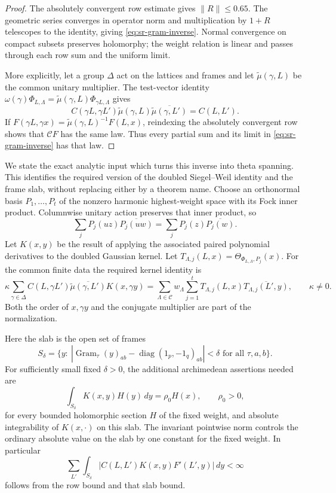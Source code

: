 \begin{proof}
The absolutely convergent row estimate gives \(\|R\|\le0.65\).
The geometric series converges in operator norm and multiplication
by \(1+R\) telescopes to the identity, giving
\eqref{eq:sr-gram-inverse}.
Normal convergence on compact subsets preserves holomorphy;
the weight relation is linear and passes through each row sum
and the uniform limit.

More explicitly, let a group \(\Delta\) act on the lattices and
frames and let \(\widetilde\mu(\gamma,L)\) be the common unitary multiplier.
The test-vector identity
\(\omega(\gamma)\Phi_{L,\Lambda}
 =\widetilde\mu(\gamma,L)\Phi_{\gamma L,\Lambda}\)
gives
\[
 C(\gamma L,\gamma L')\widetilde\mu(\gamma,L)
        \overline{\widetilde\mu(\gamma,L')}=C(L,L').
\]
If
\(F(\gamma L,\gamma x)=\widetilde\mu(\gamma,L)^{-1}F(L,x)\),
reindexing the absolutely convergent row shows that
\(\mathcal CF\) has the same law.  Thus every partial sum and
its limit in \eqref{eq:sr-gram-inverse} has that law.
\end{proof}

We state the exact analytic input which turns this inverse into
theta spanning.  This identifies the required version of the
doubled Siegel--Weil identity and the frame slab, without replacing
either by a theorem name.
Choose an orthonormal basis \(P_1,\ldots,P_t\) of the nonzero
harmonic highest-weight space with its Fock inner product.
Columnwise unitary action preserves that inner product, so
\[
 \sum_jP_j(uz)\overline{P_j(uw)}
       =\sum_jP_j(z)\overline{P_j(w)}.
\]
Let \(K(x,y)\) be the result of applying the associated paired
polynomial derivatives to the doubled Gaussian kernel.
Let
\(T_{\Lambda,j}(L,x)=\Theta_{\Phi_{L,\Lambda},P_j}(x)\).
For the common finite data the required kernel identity is
\begin{equation}\label{eq:sr-doubled-kernel-input}
 \kappa\sum_{\gamma\in\Delta}
    C(L,\gamma L')\overline{\widetilde\mu(\gamma,L')}K(x,\gamma y)
  =\sum_{\Lambda\in\mathcal C}w_\Lambda
       \sum_{j=1}^t
       T_{\Lambda,j}(L,x)
       \overline{T_{\Lambda,j}(L',y)},\qquad \kappa\ne0.
\end{equation}
Both the order of \(x,\gamma y\) and the conjugate multiplier are
part of the normalization.

Here the slab is the open set of frames
\[
 S_\delta=\{y:\ |\operatorname{Gram}_\tau(y)_{ab}
                  -\operatorname{diag}(1_p,-1_q)_{ab}|<\delta
                       \text{ for all }\tau,a,b\}.
\]
For sufficiently small fixed \(\delta>0\), the additional
archimedean assertions needed are
\begin{equation}\label{eq:sr-slab-reproduction-input}
 \int_{S_\delta}K(x,y)H(y)\,dy=\rho_0H(x),
 \qquad \rho_0>0,
\end{equation}
for every bounded holomorphic section \(H\) of the fixed weight,
and absolute integrability of \(K(x,\cdot)\) on this slab.
The invariant pointwise norm controls the ordinary absolute value
on the slab by one constant for the fixed weight.  In particular
\[
 \sum_{L'}\int_{S_\delta}
       |C(L,L')K(x,y)F'(L',y)|\,dy<\infty
\]
follows from the row bound and that slab bound.

